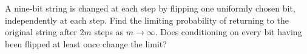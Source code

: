 A nine-bit string is changed at each step by flipping one uniformly chosen bit, independently at each step. Find the limiting probability of returning to the original string after $2m$ steps as $m\to\infty$. Does conditioning on every bit having been flipped at least once change the limit?
